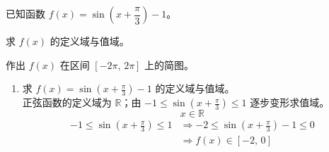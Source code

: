 \documentclass[12pt,a4paper]{exam-zh}
\begin{document}
\begin{question}[points = 6]
    已知函数 $f(x)=\sin\left(x+\dfrac{\pi}{3}\right)-1$。
    \begin{questionparts}
        \item 求 $f(x)$ 的定义域与值域。 

        \item 作出 $f(x)$ 在区间 $[-2\pi,\,2\pi]$ 上的简图。 
    \end{questionparts}
\end{question}

\begin{solution}
    \begin{enumerate}[label=(\alph*)]
        \item 求 $f(x)=\sin\left(x+\frac{\pi}{3}\right)-1$ 的定义域与值域。 \\
        正弦函数的定义域为 $\mathbb{R}$；由 $-1\le\sin\left(x+\frac{\pi}{3}\right)\le 1$ 逐步变形求值域。 \\
        \[
            x\in\mathbb{R}
        \]
        \begin{align*}
            -1 \le \sin\left(x+\frac{\pi}{3}\right) \le 1 &\Rightarrow -2 \le \sin\left(x+\frac{\pi}{3}\right)-1 \le 0 \\
            &\Rightarrow f(x)\in[-2,\,0]
        \end{align*}


\end{enumerate}
\end{solution}
\end{document}
